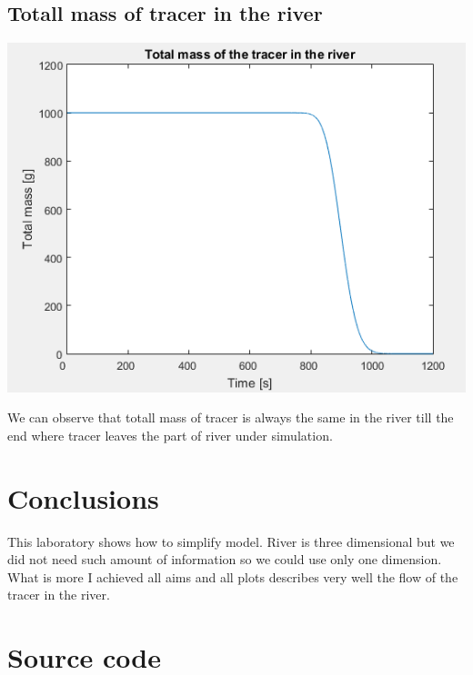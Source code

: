 \documentclass[a4paper,12pt]{article}
\begin{document}
\subsection{Totall mass of tracer in the river}
\centerline{\includegraphics[scale=1]{totalMass}}
We can observe that totall mass of tracer is always the same in the river till the end where tracer leaves the part of river under simulation.
\section{Conclusions}
This laboratory shows how to simplify model. River is three dimensional but we did not need such amount of information so we could use only one dimension. What is more I achieved all aims and all plots describes very well the flow of the tracer in the river.
\section{Source code}

\end{document}
